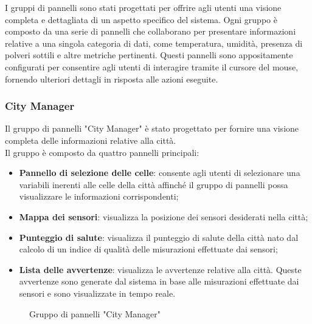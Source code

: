 I gruppi di pannelli sono stati progettati per offrire agli utenti una visione completa e dettagliata di un aspetto specifico del sistema. Ogni gruppo è composto da una serie di pannelli che collaborano per presentare informazioni relative a una singola categoria di dati, come temperatura, umidità, presenza di polveri sottili e altre metriche pertinenti. Questi pannelli sono appositamente configurati per consentire agli utenti di interagire tramite il cursore del mouse, fornendo ulteriori dettagli in risposta alle azioni eseguite.
\\
\subsubsection{City Manager}
Il gruppo di pannelli "City Manager" è stato progettato per fornire una visione completa delle informazioni relative alla città.\\
Il gruppo è composto da quattro pannelli principali:
\begin{itemize}
    \item \textbf{Pannello di selezione delle celle}: consente agli utenti di selezionare una variabili inerenti alle celle della città affinché il gruppo di pannelli possa visualizzare le informazioni corrispondenti;
    \item \textbf{Mappa dei sensori}: visualizza la posizione dei sensori desiderati nella città;
    \item \textbf{Punteggio di salute}: visualizza il punteggio di salute della città nato dal calcolo di un indice di qualità delle misurazioni effettuate dai sensori;
    \item \textbf{Lista delle avvertenze}: visualizza le avvertenze relative alla città. Queste avvertenze sono generate dal sistema in base alle misurazioni effettuate dai sensori e sono visualizzate in tempo reale.
\end{itemize}
\begin{figure}[H]
    \centering
    \caption{Gruppo di pannelli "City Manager"}
    \label{fig:my_label}
\end{figure}


